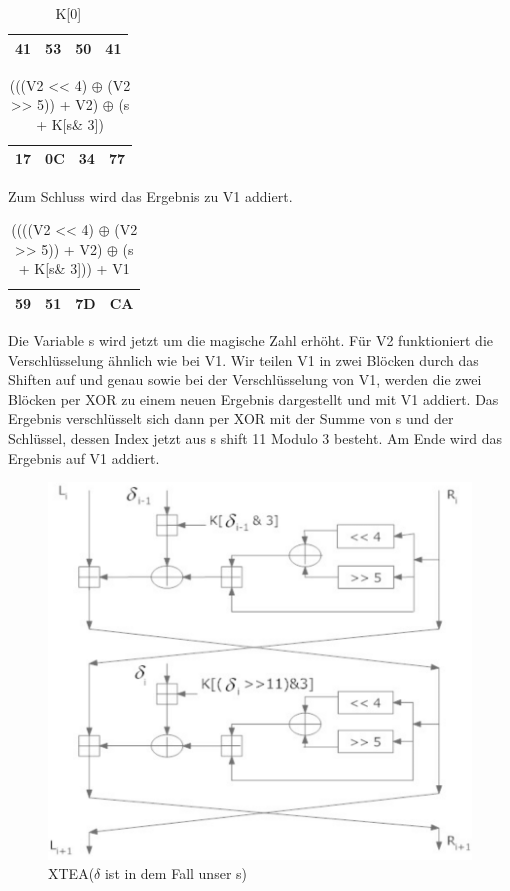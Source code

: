 \documentclass[course=asp]{aspdoc}
\begin{document}
\begin{table}[H]
\centering
    \begin{tabular}{|l|l|l|l|}
        \hline
        41 & 53 & 50 & 41    \\
        \hline
    \end{tabular}
    \caption{K[0]}
\end{table}

\begin{table}[H]
\centering
    \begin{tabular}{|l|l|l|l|}
        \hline
        17 & 0C & 34 & 77    \\
        \hline
    \end{tabular}
    \caption{(((V2 << 4) $\oplus$ (V2 >> 5)) + V2) $\oplus$ (s + K[s\& 3])}
\end{table}
Zum Schluss wird das Ergebnis zu V1 addiert.

\begin{table}[H]
\centering
    \begin{tabular}{|l|l|l|l|}
        \hline
        59 & 51 & 7D & CA    \\
        \hline
    \end{tabular}
    \caption{((((V2 << 4) $\oplus$ (V2 >> 5)) + V2) $\oplus$ (s + K[s\& 3])) + V1}
\end{table}



Die Variable s wird jetzt um die magische Zahl erhöht. Für V2 funktioniert die Verschlüsselung ähnlich wie bei V1. Wir teilen V1 in zwei Blöcken durch das Shiften auf und genau sowie bei der Verschlüsselung von V1, werden die zwei Blöcken per XOR zu einem neuen Ergebnis dargestellt und mit V1 addiert. Das Ergebnis verschlüsselt sich dann per XOR mit der Summe von s und der Schlüssel, dessen Index jetzt aus s shift 11 Modulo 3 besteht. Am Ende wird das Ergebnis auf V1 addiert.
\begin{figure}[h]
\centering
\includegraphics[scale = 0.55]{XTEA.png}
\caption{XTEA(${\delta}$ ist in dem Fall unser s)}
\end{figure}
\newpage
\end{document}
